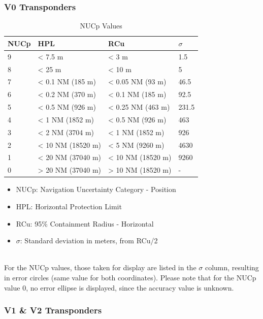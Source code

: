 \subsubsection{V0 Transponders}

\begin{table}[H]
  \center
  \begin{tabular}{ | l | l | l | l |}
    \hline
    \textbf{NUCp} & \textbf{HPL} & \textbf{RCu} & \textbf{$\sigma$} \\ \hline
    9   & < 7.5 m            & < 3 m             & 1.5  \\ \hline
    8   & < 25 m             & < 10 m            & 5  \\ \hline
    7   & < 0.1 NM (185 m)   & < 0.05 NM (93 m)  & 46.5  \\ \hline
    6   & < 0.2 NM (370 m)   & < 0.1 NM (185 m)  & 92.5  \\ \hline
    5   & < 0.5 NM (926 m)   & < 0.25 NM (463 m) & 231.5  \\ \hline
    4   & < 1 NM (1852 m)    & < 0.5 NM (926 m)  & 463  \\ \hline
    3   & < 2 NM (3704 m)    & < 1 NM (1852 m)   & 926  \\ \hline
    2   & < 10 NM (18520 m)  & < 5 NM (9260 m)   & 4630  \\ \hline
    1   & < 20 NM (37040 m)  & < 10 NM (18520 m) & 9260  \\ \hline
    0   & > 20 NM (37040 m)  & > 10 NM (18520 m) & -  \\ \hline
  \end{tabular}
  \caption{NUCp Values}
\end{table}

\begin{itemize}
\item NUCp: Navigation Uncertainty Category - Position
\item HPL: Horizontal Protection Limit
\item RCu: 95\% Containment Radius - Horizontal
\item $\sigma$: Standard deviation in meters, from RCu/2
\end{itemize}
\ \\

For the NUCp values, those taken for display are listed in the $\sigma$ column, resulting in error circles (same value for both coordinates). Please note that for the NUCp value 0, no error ellipse is displayed, since the accuracy value is unknown.

\subsubsection{V1 \& V2 Transponders}

